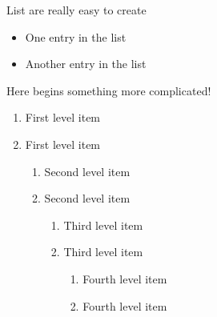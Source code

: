 \documentclass{article}
\begin{document}
List are really easy to create
\begin{itemize}
  \item One entry in the list
  \item Another entry in the list
\end{itemize}

Here begins something more complicated!
 \begin{enumerate}
   \item First level item
   \item First level item
   \begin{enumerate}
     \item Second level item
     \item Second level item
     \begin{enumerate}
       \item Third level item
       \item Third level item
       \begin{enumerate}
         \item Fourth level item
         \item Fourth level item
       \end{enumerate}
     \end{enumerate}
   \end{enumerate}
 \end{enumerate}
 
 
\end{document}
